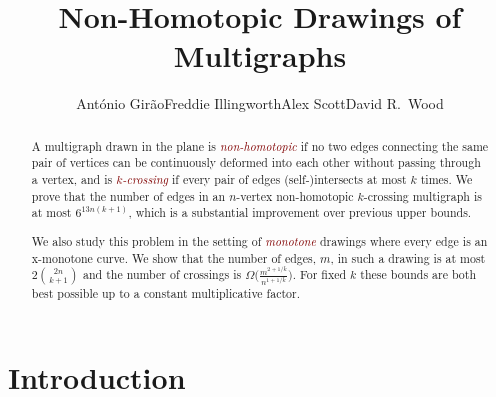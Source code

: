 \documentclass[a4paper,11pt]{article}
\newcommand{\defn}[1]{\textcolor{Maroon}{\emph{#1}}}
\begin{document}
\title{\bf Non-Homotopic Drawings of Multigraphs}
\author{Ant\'onio Gir\~ao\footnotemark[1] \qquad Freddie Illingworth\footnotemark[2] \qquad Alex Scott\footnotemark[1] \qquad  David R.\ Wood\footnotemark[3]}

\maketitle

\begin{abstract}
    A multigraph drawn in the plane is \defn{non-homotopic} if no two edges connecting the same pair of vertices can be continuously deformed into each other without passing through a vertex, and is \defn{$k$-crossing} if every pair of edges (self-)intersects at most $k$ times. We prove that the number of edges in an $n$-vertex non-homotopic $k$-crossing multigraph is at most $6^{13 n (k + 1)}$, which is a substantial improvement over previous upper bounds.

    We also study this problem in the setting of \defn{monotone} drawings where every edge is an x-monotone curve. We show that the number of edges, $m$, in such a drawing is at most $2 \binom{2n}{k + 1}$ and the number of crossings is $\Omega\bigl(\frac{m^{2 + 1/k}}{n^{1 + 1/k}}\bigr)$. For fixed $k$ these bounds are both best possible up to a constant multiplicative factor. 
\end{abstract}

\renewcommand{\thefootnote}{\fnsymbol{footnote}} %




\renewcommand{\thefootnote}{\arabic{footnote}} %

\section{Introduction}\label{sec:intro}
\end{document}
